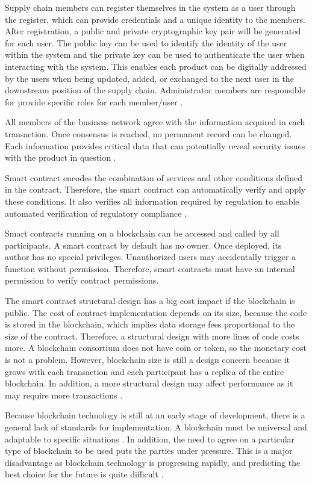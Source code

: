 Supply chain members can register themselves in the system as a user through the register, which can provide credentials and a unique identity to the members. After registration, a public and private cryptographic key pair will be generated for each user. The public key can be used to identify the identity of the user within the system and the private key can be used to authenticate the user when interacting with the system. This enables each product can be digitally addressed by the users when being updated, added, or exchanged to the next user in the downstream position of the supply chain. Administrator members are responsible for provide specific roles for each member/user \cite{caro2018blockchain}.

All members of the business network agree with the information acquired in each transaction. Once consensus is reached, no permanent record can be changed. Each information provides critical data that can potentially reveal security issues with the product in question \cite{galvez2018future}.

Smart contract encodes the combination of services and other conditions defined in the contract. Therefore, the smart contract can automatically verify and apply these conditions. It also verifies all information required by regulation to enable automated verification of regulatory compliance \cite{lu2017adaptable}. 

Smart contracts running on a blockchain can be accessed and called by all participants. A smart contract by default has no owner. Once deployed, its author has no special privileges. Unauthorized users may accidentally trigger a function without permission. Therefore, smart contracts must have an internal permission to verify contract permissions.

The smart contract structural design has a big cost impact if the blockchain is public. The cost of contract implementation depends on its size, because the code is stored in the blockchain, which implies data storage fees proportional to the size of the contract. Therefore, a structural design with more lines of code costs more. A blockchain consortium does not have coin or token, so the monetary cost is not a problem. However, blockchain size is still a design concern because it grows with each transaction and each participant has a replica of the entire blockchain. In addition, a more structural design may affect performance as it may require more transactions \cite{lu2017adaptable}.

Because blockchain technology is still at an early stage of development, there is a general lack of standards for implementation. A blockchain must be universal and adaptable to specific situations \cite{valenta2017comparison}. In addition, the need to agree on a particular type of blockchain to be used puts the parties under pressure. This is a major disadvantage as blockchain technology is progressing rapidly, and predicting the best choice for the future is quite difficult \cite{galvez2018future}.

